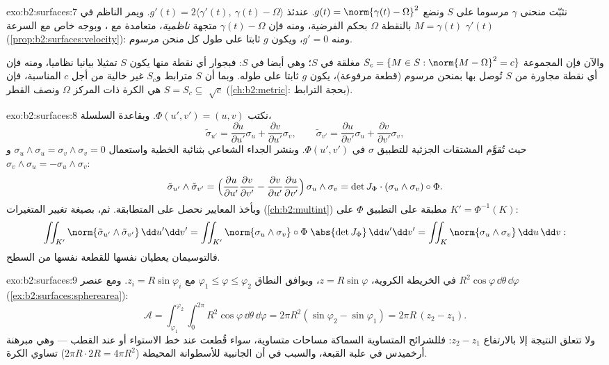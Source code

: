 \begin{solution}{exo:b2:surfaces:7}
نثبّت منحنى $\gamma$ مرسوما على $S$ ونضع $g(t) = \norm{\gamma(t)
- \Omega}^2$. عندئذ $g'(t) = 2\langle \gamma'(t),\ \gamma(t) -
\Omega\rangle$. ويمر
الناظم في $M = \gamma(t)$ بالنقطة $\Omega$ بحكم الفرضية، ومنه فإن $\gamma(t) - \Omega$ متجهة
\emph{ناظمية}، متعامدة مع ، وبوجه خاص مع السرعة $\gamma'(t)$
(\cref{prop:b2:surfaces:velocity}): ومنه $g' =
0$، ويكون $g$ ثابتا على طول كل منحن مرسوم.

والآن فإن المجموعة $S_c = \{M \in S : \norm{M - \Omega}^2 = c\}$ مغلقة في $S$؛ وهي أيضا  في $S$:
فبجوار أي نقطة منها يكون $S$ تمثيلا بيانيا نظاميا، ومنه فإن أي
نقطة مجاورة من $S$ تُوصل بها بمنحن مرسوم (قطعة مرفوعة)، يكون
$g$ ثابتا على طوله. وبما أن $S$ مترابط و$S_c$ غير خالية من
أجل $c$ المناسبة، فإن $S = S_c
\subseteq$ هي الكرة ذات المركز $\Omega$ ونصف
القطر $\sqrt c$ (\cref{ch:b2:metric}: بحجة الترابط).
\end{solution}

\begin{solution}{exo:b2:surfaces:8}
نكتب $\Phi(u', v') = (u, v)$. وبقاعدة السلسلة،
\[
\tilde\sigma_{u'} = \frac{\partial u}{\partial u'}\sigma_u
+ \frac{\partial v}{\partial u'}\sigma_v,
\qquad
\tilde\sigma_{v'} = \frac{\partial u}{\partial v'}\sigma_u
+ \frac{\partial v}{\partial v'}\sigma_v ,
\]
حيث تُقوَّم المشتقات الجزئية للتطبيق $\sigma$ في $\Phi(u',v')$. وبنشر الجداء
الشعاعي بثنائية الخطية واستعمال $\sigma_u \wedge \sigma_u =
\sigma_v \wedge \sigma_v = 0$ و$\sigma_v \wedge \sigma_u =
-\sigma_u \wedge \sigma_v$:
\[
\tilde\sigma_{u'} \wedge \tilde\sigma_{v'}
= \Bigl(\frac{\partial u}{\partial u'}
\frac{\partial v}{\partial v'}
- \frac{\partial v}{\partial u'}
\frac{\partial u}{\partial v'}\Bigr)\,
\sigma_u \wedge \sigma_v
= \det J_\Phi \cdot (\sigma_u \wedge \sigma_v)\circ\Phi .
\]
وبأخذ المعايير نحصل على المتطابقة. ثم، بصيغة تغيير المتغيرات
(\cref{ch:b2:multint}) مطبقة على التطبيق $\Phi$ على $K' =
\Phi^{-1}(K)$:
\[
\iint_{K'} \norm{\tilde\sigma_{u'} \wedge \tilde\sigma_{v'}}
\,\dd u'\dd v'
= \iint_{K'} \norm{\sigma_u \wedge \sigma_v}\circ\Phi\;
\abs{\det J_\Phi}\,\dd u'\dd v'
= \iint_K \norm{\sigma_u \wedge \sigma_v}\,\dd u\,\dd v :
\]
فالتوسيمان يعطيان  نفسها للقطعة نفسها من السطح.
\end{solution}

\begin{solution}{exo:b2:surfaces:9}
في الخريطة الكروية، $z = R\sin\varphi$، ويوافق النطاق $\varphi_1 \leq \varphi \leq \varphi_2$ مع $z_i = R\sin\varphi_i$. ومع
عنصر 
$R^2\cos\varphi\,\dd\theta\,\dd\varphi$
(\cref{ex:b2:surfaces:spherearea}):
\[
\mathcal A = \int_{\varphi_1}^{\varphi_2}\!\!\int_0^{2\pi}
R^2\cos\varphi\,\dd\theta\,\dd\varphi
= 2\pi R^2(\sin\varphi_2 - \sin\varphi_1)
= 2\pi R\,(z_2 - z_1) .
\]
ولا تتعلق النتيجة إلا بالارتفاع $z_2 - z_1$: فللشرائح المتساوية السماكة
مساحات متساوية، سواء قُطعت عند خط الاستواء أو عند القطب --- وهي
مبرهنة أرخميدس في علبة القبعة، والسبب في أن  الجانبية
للأسطوانة المحيطة ($2\pi R \cdot
2R = 4\pi R^2$) تساوي  الكرة.
\end{solution}

